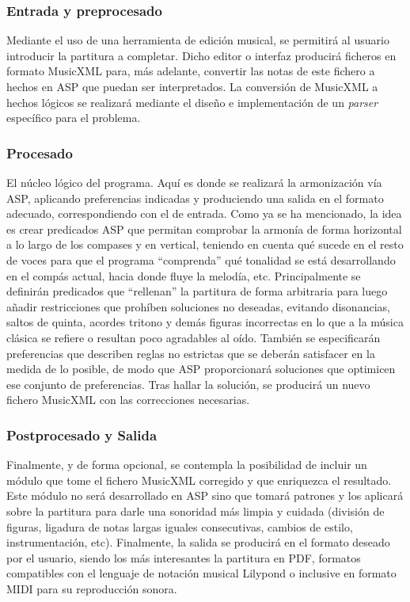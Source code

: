 \subsubsection{Entrada y preprocesado}
Mediante el uso de una herramienta de edición musical, se permitirá al usuario introducir la partitura a completar. Dicho editor o interfaz producirá ficheros en formato MusicXML para, más adelante, convertir las notas de este fichero a hechos en ASP que puedan ser interpretados. La conversión de MusicXML a hechos lógicos se realizará mediante el diseño e implementación de un \textit{parser} específico para el problema.

\subsubsection{Procesado}
El núcleo lógico del programa. Aquí es donde se realizará la armonización vía ASP, aplicando preferencias indicadas y produciendo una salida en el formato adecuado, correspondiendo con el de entrada. Como ya se ha mencionado, la idea es crear predicados ASP que permitan comprobar la armonía de forma horizontal a lo largo de los compases y en vertical, teniendo en cuenta qué sucede en el resto de voces para que el programa “comprenda” qué tonalidad se está desarrollando en el compás actual, hacia donde fluye la melodía, etc. Principalmente se definirán predicados que “rellenan” la partitura de forma arbitraria para luego añadir restricciones que prohíben soluciones no deseadas, evitando disonancias, saltos de quinta, acordes tritono y demás figuras incorrectas en lo que a la música clásica se refiere o resultan poco agradables al oído. También se especificarán preferencias que describen reglas no estrictas que se deberán satisfacer en la medida de lo posible, de modo que ASP proporcionará soluciones que optimicen ese conjunto de preferencias. Tras hallar la solución, se producirá un nuevo fichero MusicXML con las correcciones necesarias. 

\subsubsection{Postprocesado y Salida}
Finalmente, y de forma opcional, se contempla la posibilidad de incluir un módulo que tome el fichero MusicXML corregido y que enriquezca el resultado. Este módulo no será desarrollado en ASP sino que tomará patrones y los aplicará sobre la partitura para darle una sonoridad más limpia y cuidada (división de figuras, ligadura de notas largas iguales consecutivas, cambios de estilo, instrumentación, etc). Finalmente, la salida se producirá en el formato deseado por el usuario, siendo los más interesantes la partitura en PDF, formatos compatibles con el lenguaje de notación musical Lilypond o inclusive en formato MIDI para su reproducción sonora. 


